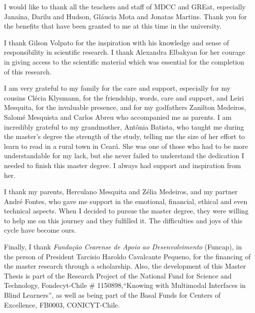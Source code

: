 I would like to thank all the teachers and staff of MDCC and GREat, especially Janaína, Darilu and Hudson, Gláucia Mota and Jonatas Martins. Thank you for the benefits that have been granted to me at this time in the university.

I thank Gilson Volpato for the inspiration with his knowledge and sense of responsibility in scientific research. I thank Alexandra Elbakyan for her courage in giving access to the scientific material which was essential for the completion of this research.

I am very grateful to my family for the care and support, especially for my cousins Clécia Klysmann, for the friendship, words, care and support, and  Leiri Mesquita, for the invaluable presence, and for my godfathers Zanilton Medeiros, Salomé Mesquista and Carlos Abreu who accompanied me as parents. I am incredibly grateful to my grandmother, Antônia Batista, who taught me during the master's degree the strength of the study, telling me the size of her effort to learn to read in a rural town in Ceará. She was one of those who had to be more understandable for my lack, but she never failed to understand the dedication I needed to finish this master degree. I always had support and inspiration from her.

I thank my parents, Herculano Mesquita and Zélia Medeiros, and my partner André Fontes, who gave me support in the emotional, financial, ethical and even technical aspects. When I decided to pursue the master degree, they were willing to help me on this journey and they fulfilled it. The difficulties and joys of this cycle have become ours.

Finally, I thank \textit{Fundação Cearense de Apoio ao Desenvolvimento} (Funcap), in the person of President Tarcisio Haroldo Cavalcante Pequeno, for the financing of the master research through a scholarship. Also, the development of this Master Thesis is part of the Research Project of the National Fund for Science and Technology, Fondecyt-Chile \# 1150898,``Knowing with Multimodal Interfaces in Blind Learners'', as well as being part of the Basal Funds for Centers of Excellence, FB0003, CONICYT-Chile.



